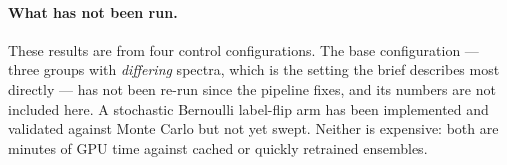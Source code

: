 \documentclass[11pt,a4paper]{article}
\begin{document}
\paragraph{What has not been run.} These results are from four control
configurations. The base configuration --- three groups with \emph{differing}
spectra, which is the setting the brief describes most directly --- has not been
re-run since the pipeline fixes, and its numbers are not included here. A
stochastic Bernoulli label-flip arm has been implemented and validated against
Monte Carlo but not yet swept. Neither is expensive: both are minutes of GPU
time against cached or quickly retrained ensembles.
\end{document}
